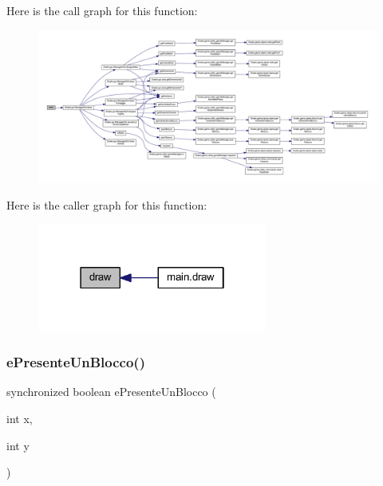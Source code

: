 Here is the call graph for this function\+:
\nopagebreak
\begin{figure}[H]
\begin{center}
\leavevmode
\includegraphics[width=350pt]{class_snake_1_1game_1_1gioco_a4262ff48c6fe3e20a0e3c9295158e375_cgraph}
\end{center}
\end{figure}
Here is the caller graph for this function\+:
\nopagebreak
\begin{figure}[H]
\begin{center}
\leavevmode
\includegraphics[width=214pt]{class_snake_1_1game_1_1gioco_a4262ff48c6fe3e20a0e3c9295158e375_icgraph}
\end{center}
\end{figure}
\mbox{\label{class_snake_1_1game_1_1gioco_a0b9510c56170e691e67ab6308a4bd1f6}} 
\subsubsection{\texorpdfstring{e\+Presente\+Un\+Blocco()}{ePresenteUnBlocco()}}
{\footnotesize\ttfamily synchronized boolean e\+Presente\+Un\+Blocco (\begin{DoxyParamCaption}\item[{int}]{x,  }\item[{int}]{y }\end{DoxyParamCaption})}



